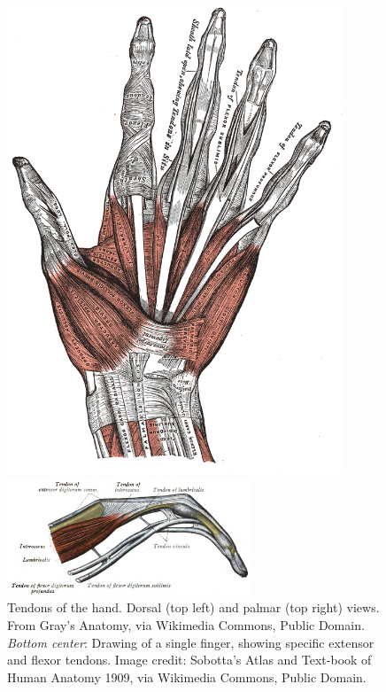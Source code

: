 \documentclass[12pt]{article}
\begin{document}
\begin{figure}[h!]
\begin{minipage}{.5\textwidth}
\includegraphics[width=0.9\textwidth]{images/gray_tendons_ventral.png}
\end{minipage}
\vspace{0.2cm}
\centering
\centering
\includegraphics[width=0.65\textwidth]{images/extensorFlexor.png}
\caption{Tendons of the hand. Dorsal (top left) and palmar (top right) views. From Gray's Anatomy, via Wikimedia Commons, Public Domain. \textit{Bottom center}: Drawing of a single finger, showing specific extensor and flexor tendons. Image credit: Sobotta's Atlas and Text-book of Human Anatomy 1909, via Wikimedia Commons, Public Domain.}
\label{fig:tendons}
\end{figure}
\end{document}
